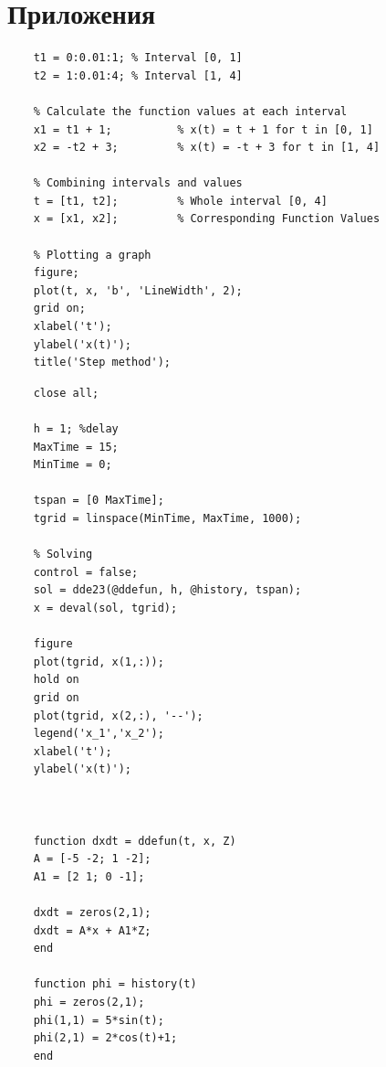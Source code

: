 \documentclass[a4paper, 12pt]{article}
\begin{document}
    \section{Приложения}
    \begin{lstlisting}[label=task1code, caption={Программа для построения графика решения системы с задержкой методом шагов}]
    % Setting intervals
    t1 = 0:0.01:1; % Interval [0, 1]
    t2 = 1:0.01:4; % Interval [1, 4]

    % Calculate the function values at each interval
    x1 = t1 + 1;          % x(t) = t + 1 for t in [0, 1]
    x2 = -t2 + 3;         % x(t) = -t + 3 for t in [1, 4]

    % Combining intervals and values
    t = [t1, t2];         % Whole interval [0, 4]
    x = [x1, x2];         % Corresponding Function Values

    % Plotting a graph
    figure;
    plot(t, x, 'b', 'LineWidth', 2);
    grid on;
    xlabel('t');
    ylabel('x(t)');
    title('Step method');
    \end{lstlisting}


    \begin{lstlisting}[label=task3code1, caption={Программа для построения графика системы с задержкой}]
    %LabWork 5
    close all;

    h = 1; %delay
    MaxTime = 15;
    MinTime = 0;

    tspan = [0 MaxTime];
    tgrid = linspace(MinTime, MaxTime, 1000);

    % Solving
    control = false;
    sol = dde23(@ddefun, h, @history, tspan);
    x = deval(sol, tgrid);

    figure
    plot(tgrid, x(1,:));
    hold on
    grid on
    plot(tgrid, x(2,:), '--');
    legend('x_1','x_2');
    xlabel('t');
    ylabel('x(t)');



    function dxdt = ddefun(t, x, Z)
    A = [-5 -2; 1 -2];
    A1 = [2 1; 0 -1];

    dxdt = zeros(2,1);
    dxdt = A*x + A1*Z;
    end

    function phi = history(t)
    phi = zeros(2,1);
    phi(1,1) = 5*sin(t);
    phi(2,1) = 2*cos(t)+1;
    end
    \end{lstlisting}
\end{document}
